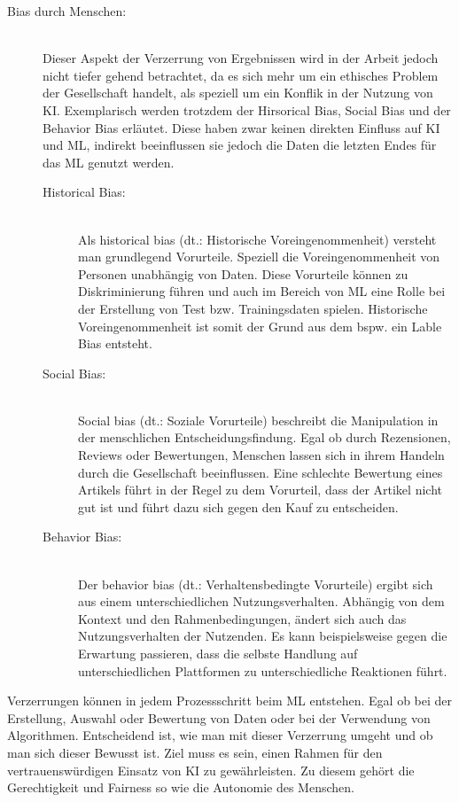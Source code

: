 \begin{onehalfspace}
\begin{description}
            \item [Bias durch Menschen:] \hfill \\
            Dieser Aspekt der Verzerrung von Ergebnissen wird in der Arbeit jedoch nicht tiefer gehend betrachtet, da es sich mehr um ein ethisches Problem der Gesellschaft handelt, als speziell um ein Konflik in der Nutzung von \ac{KI}. Exemplarisch werden trotzdem der Hirsorical Bias, Social Bias und der Behavior Bias erläutet. Diese haben zwar keinen direkten Einfluss auf \ac*{KI} und \ac*{ML}, indirekt beeinflussen sie jedoch die Daten die letzten Endes für das \ac*{ML} genutzt werden.
            \begin{description}
                \item [Historical Bias:] \hfill \\
                Als \glqq{}historical bias\grqq{} (\ac*{dt}.: Historische Voreingenommenheit) versteht man grundlegend Vorurteile. Speziell die Voreingenommenheit von Personen unabhängig von Daten. Diese Vorurteile können zu Diskriminierung führen und auch im Bereich von \ac*{ML} eine Rolle bei der Erstellung von Test bzw. Trainingsdaten spielen. Historische Voreingenommenheit ist somit der Grund aus dem bspw. ein Lable Bias entsteht.\cite{Mehrabi2021}\cite{Parkavi2018}
                \item [Social Bias:] \hfill \\
                \glqq{}Social bias\grqq{} (\ac*{dt}.: Soziale Vorurteile) beschreibt die Manipulation in der menschlichen Entscheidungsfindung. Egal ob durch Rezensionen, Reviews oder Bewertungen, Menschen lassen sich in ihrem Handeln durch die Gesellschaft beeinflussen. Eine schlechte Bewertung eines Artikels führt in der Regel zu dem Vorurteil, dass der Artikel nicht gut ist und führt dazu sich gegen den Kauf zu entscheiden.\cite{Mehrabi2021}\cite{Parkavi2018}
                \item [Behavior Bias:] \hfill \\
                Der \glqq{}behavior bias\grqq{} (\ac*{dt}.: Verhaltensbedingte Vorurteile) ergibt sich aus einem unterschiedlichen Nutzungsverhalten. Abhängig von dem Kontext und den Rahmenbedingungen, ändert sich auch das Nutzungsverhalten der Nutzenden. Es kann beispielsweise gegen die Erwartung passieren, dass die selbste Handlung auf unterschiedlichen Plattformen zu unterschiedliche Reaktionen führt.\cite{Mehrabi2021}
            \end{description}
        \end{description}
        Verzerrungen können in jedem Prozessschritt beim \ac*{ML} entstehen. Egal ob bei der Erstellung, Auswahl oder Bewertung von Daten oder bei der Verwendung von Algorithmen. Entscheidend ist, wie man mit dieser Verzerrung umgeht und ob man sich dieser Bewusst ist. Ziel muss es sein, einen Rahmen für den vertrauenswürdigen Einsatz von \ac*{KI} zu gewährleisten. Zu diesem gehört die Gerechtigkeit und Fairness so wie die Autonomie des Menschen. 

\end{onehalfspace}
